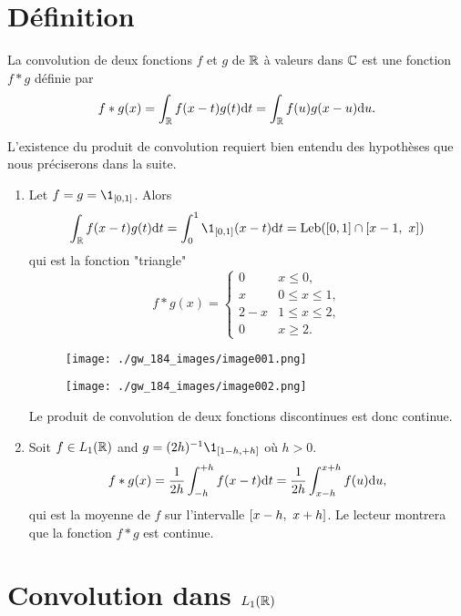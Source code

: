\section{D\'efinition}
\begin{definition}
La convolution de deux fonctions $f$ et $g$ de $\mathbb{R}$ \`a valeurs dans $\mathbb{C}$ est une fonction $f*g$ d\'efinie par
$$
f*g(x)=\int_{\mathbb{R}}f(x-t)g(t)\mathrm{d} t=\int_{\mathbb{R}}f(u)g(x-u) \mathrm{d} u.
$$
\end{definition}
L'existence du produit de convolution requiert bien entendu des hypoth\`eses que nous pr\'eciserons dans la suite.
\begin{example}
\label{example:convolution}
\begin{enumerate}[label=(\roman*),wide=0pt, labelindent=\parindent]
\item Let $f=g=\1_{[0,1]}$. Alors
$$
\int_{\rset}f(x-t)g(t) \rmd t=\int_{0}^{1}\1_{[0,1]}(x-t) \rmd t= \Leb(\ccint{0,1} \cap \ccint{x-1,\ x})
$$
qui est la fonction "triangle"
$$
f*g(x)=\begin{cases}
0 &  x\leq 0,\\
x &  0\leq x\leq 1,\\
2-x & 1\leq x\leq 2,\\
0 &  x\geq 2.
\end{cases}
$$
\begin{figure}
\texttt{[image: ./gw\_184\_images/image001.png]}

\texttt{[image: ./gw\_184\_images/image002.png]}
\end{figure}
Le produit de convolution de deux fonctions discontinues est donc continue.
\item  Soit $f\in L_1(\mathbb{R})$ and $g= (2h)^{-1} \1_{\ccint{1-h,+h}}$ o\`u $h>0$.
$$
f*g(x)=\frac{1}{2h}\int_{-h}^{+h}f(x-t) \mathrm{d} t=\frac{1}{2h}\int_{x-h}^{x+h}f(u) \mathrm{d}  u,
$$
qui est la moyenne de $f$ sur l'intervalle $\left[x-h,\ x+h\right]$. Le lecteur montrera que la fonction $f*g$ est continue.
\end{enumerate}
\end{example}


\section{Convolution dans $L_1(\mathbb{R})$}

